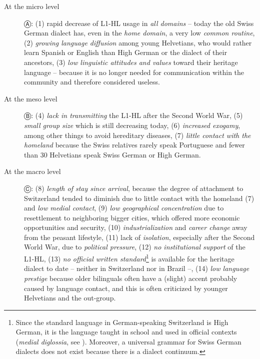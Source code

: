 \documentclass[output=paper]{langscibook}
\begin{document}
\begin{description}
\item[At the micro level] Ⓐ: (1) rapid decrease of L1-HL usage in \emph{all domains} -- today the old Swiss German dialect has, even in the \emph{home domain}, a very low \emph{common routine}, (2) \emph{growing language diffusion} among young Helvetians, who would rather learn Spanish or English than High German or the dialect of their ancestors, (3) \emph{low linguistic attitudes and values} toward their heritage language -- because it is no longer needed for communication within the community and therefore considered useless.

\item[At the meso level] Ⓑ: (4) \emph{lack in transmitting} the L1-HL after the Second World War, (5) \emph{small group size} which is still decreasing today, (6) \emph{increased exogamy}, among other things to avoid hereditary diseases, (7) \emph{little contact with the homeland} because the Swiss relatives rarely speak Portuguese and fewer than 30 Helvetians speak Swiss German or High German.

\item[At the macro level] Ⓒ: (8) \emph{length of stay since arrival}, because the degree of attachment to Switzerland tended to diminish due to little contact with the homeland (7) and \emph{low medial contact}, (9) \emph{low geographical concentration} due to resettlement to neighboring bigger cities, which offered more economic opportunities and security, (10) \emph{industrialization} and \emph{career change} away from the peasant lifestyle, (11) lack of \emph{isolation}, especially after the Second World War, due to \emph{political pressure}, (12) \emph{no institutional support} of the L1-HL, (13) \emph{no official written standard}\footnote{Since the standard language in German-speaking Switzerland is High German, it is the language taught in school and used in official contexts (\emph{medial diglossia}, see \textcite{Glaser2014}). Moreover, a universal grammar for Swiss German dialects does not exist because there is a dialect continuum.} is available for the heritage dialect to date -- neither in Switzerland nor in Brazil --, (14) \emph{low language prestige} because older bilinguals often have a (slight) accent probably caused by language contact, and this is often criticized by younger Helvetians and the out-group.
\end{description}
\end{document}
